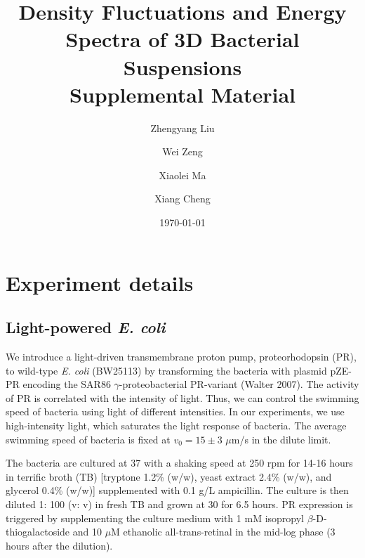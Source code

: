 \documentclass[twocolumn,aps,prx,amsmath,amssymb,longbibliography]{revtex4-2}
\date{\today}
\begin{document}
\title{Density Fluctuations and Energy Spectra of 3D Bacterial Suspensions\\
        Supplemental Material}


\author{Zhengyang Liu}
\author{Wei Zeng}
\author{Xiaolei Ma}
\author{Xiang Cheng}




\maketitle


\section{Experiment details}
\subsection{Light-powered \textit{E. coli}}
We introduce a light-driven transmembrane proton pump, proteorhodopsin (PR), to wild-type \textit{E. coli} (BW25113) by transforming the bacteria with plasmid pZE-PR encoding the SAR86 $\gamma$-proteobacterial PR-variant (Walter 2007). The activity of PR is correlated with the intensity of light. Thus, we can control the swimming speed of bacteria using light of different intensities. In our experiments, we use high-intensity light, which saturates the light response of bacteria. The average swimming speed of bacteria is fixed at $v_0 = 15 \pm 3$ $\mu$m/s in the dilute limit.

The bacteria are cultured at 37 \textcelsius{} with a shaking speed at 250 rpm for 14-16 hours in terrific broth (TB) [tryptone 1.2\% (w/w), yeast extract 2.4\% (w/w), and glycerol 0.4\% (w/w)] supplemented with 0.1 g/L ampicillin. The culture is then diluted 1: 100 (v: v) in fresh TB and grown at 30 \textcelsius{} for 6.5 hours. PR expression is triggered by supplementing the culture medium with 1 mM isopropyl $\beta$-D-thiogalactoside and 10  $\mu$M ethanolic all-trans-retinal in the mid-log phase (3 hours after the dilution).
\end{document}
